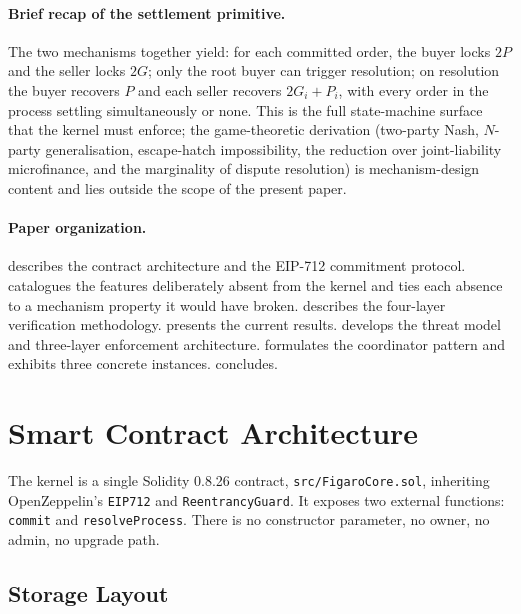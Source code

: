 \documentclass[11pt,a4paper]{article}
\theoremstyle{definition}
\theoremstyle{remark}
\newcommand{\pay}{P}
\newcommand{\cumval}{G}
\begin{document}
\paragraph{Brief recap of the settlement primitive.}
The two mechanisms together yield: for each committed order, the
buyer locks $2\pay$ and the seller locks $2\cumval$; only the root
buyer can trigger resolution; on resolution the buyer recovers $\pay$
and each seller recovers $2\cumval_i + \pay_i$, with every order in
the process settling simultaneously or none. This is the full
state-machine surface that the kernel must enforce; the
game-theoretic derivation (two-party Nash, $N$-party generalisation,
escape-hatch impossibility, the reduction over joint-liability
microfinance, and the marginality of dispute resolution) is
mechanism-design content and lies outside the scope of the present
paper.

\paragraph{Paper organization.}
 describes the contract architecture and the
EIP-712 commitment protocol.  catalogues the
features deliberately absent from the kernel and ties each absence
to a mechanism property it would have broken.
 describes the four-layer verification
methodology.  presents the current
results.  develops the threat model and
three-layer enforcement architecture.
 formulates the coordinator pattern and
exhibits three concrete instances.  concludes.

\section{Smart Contract Architecture}
\label{sec:architecture}

The kernel is a single Solidity 0.8.26 contract,
\texttt{src/FigaroCore.sol}, inheriting OpenZeppelin's \texttt{EIP712}
and \texttt{ReentrancyGuard}. It exposes two external functions:
\texttt{commit} and \texttt{resolveProcess}. There is no constructor
parameter, no owner, no admin, no upgrade path.

\subsection{Storage Layout}
\end{document}
